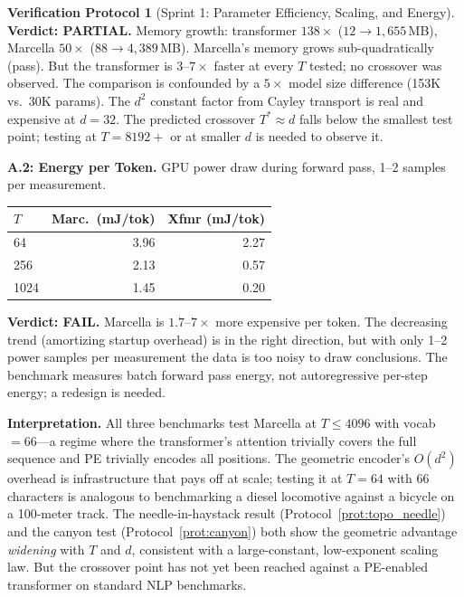 \documentclass[11pt,a4paper]{article}
\theoremstyle{definition}
\newtheorem{protocol}[theorem]{Verification Protocol}
\theoremstyle{remark}
\begin{document}
\begin{protocol}[Sprint 1: Parameter Efficiency, Scaling, 
and Energy]
\textbf{Verdict: PARTIAL.} Memory growth: transformer 
$138\times$ ($12 \to 1{,}655$\,MB), Marcella $50\times$ 
($88 \to 4{,}389$\,MB). Marcella's memory grows sub-quadratically 
(pass). But the transformer is $3$--$7\times$ faster at every $T$ 
tested; no crossover was observed. The comparison is confounded 
by a $5\times$ model size difference (153K vs.\ 30K params). 
The $d^2$ constant factor from Cayley transport is real and 
expensive at $d = 32$. The predicted crossover $T^* \approx d$ 
falls below the smallest test point; testing at $T = 8192+$ or 
at smaller $d$ is needed to observe it.

\textbf{A.2: Energy per Token.} GPU power draw during forward 
pass, 1--2 samples per measurement.

\begin{center}
\begin{tabular}{lrr}
\toprule
$T$ & Marc.\ (mJ/tok) & Xfmr (mJ/tok) \\
\midrule
64   & 3.96 & 2.27 \\
256  & 2.13 & 0.57 \\
1024 & 1.45 & 0.20 \\
\bottomrule
\end{tabular}
\end{center}

\textbf{Verdict: FAIL.} Marcella is $1.7$--$7\times$ more 
expensive per token. The decreasing trend (amortizing startup 
overhead) is in the right direction, but with only 1--2 power 
samples per measurement the data is too noisy to draw 
conclusions. The benchmark measures batch forward pass energy, 
not autoregressive per-step energy; a redesign is needed.

\textbf{Interpretation.} All three benchmarks test Marcella 
at $T \leq 4096$ with vocab $= 66$---a regime where the 
transformer's attention trivially covers the full sequence and 
PE trivially encodes all positions. The geometric encoder's 
$O(d^2)$ overhead is infrastructure that pays off at scale; 
testing it at $T = 64$ with 66 characters is analogous to 
benchmarking a diesel locomotive against a bicycle on a 
100-meter track. The needle-in-haystack result 
(Protocol~\ref{prot:topo_needle}) and the canyon test 
(Protocol~\ref{prot:canyon}) both show the geometric advantage 
\emph{widening} with $T$ and $d$, consistent with a 
large-constant, low-exponent scaling law. But the crossover 
point has not yet been reached against a PE-enabled transformer 
on standard NLP benchmarks.
\end{protocol}
\end{document}
